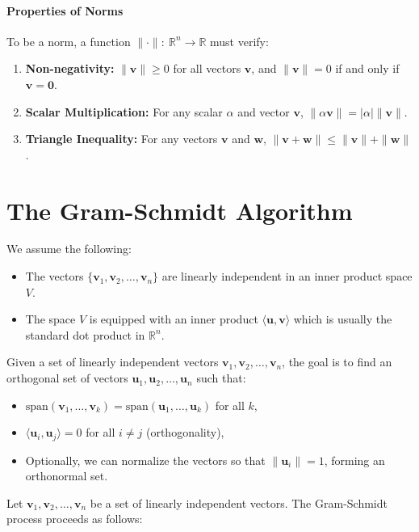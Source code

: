 \documentclass[]{article}
\newcommand{\R}{\mathbb{R}}
\begin{document}
	\paragraph{Properties of Norms}
	To be a norm, a function $\| \cdot \|: \ \R^n \to \R$ must verify:
	\begin{enumerate}
		\item \textbf{Non-negativity:}
		$\|\mathbf{v}\| \geq 0$ for all vectors $\mathbf{v}$, and $\|\mathbf{v}\| = 0$ if and only if $\mathbf{v} = \mathbf{0}$.
		\item \textbf{Scalar Multiplication:}
		For any scalar $\alpha$ and vector $\mathbf{v}$, $\|\alpha \mathbf{v}\| = |\alpha| \|\mathbf{v}\|$.
		\item \textbf{Triangle Inequality:}
		For any vectors $\mathbf{v}$ and $\mathbf{w}$, $\|\mathbf{v} + \mathbf{w}\| \leq \|\mathbf{v}\| + \|\mathbf{w}\|$.
	\end{enumerate}
	
	
	
	\section{The Gram-Schmidt Algorithm}	
	We assume the following:
	\begin{itemize}
		\item The vectors $\{ \mathbf{v}_1, \mathbf{v}_2, \dots, \mathbf{v}_n \}$ are linearly independent in an inner product space $V$.
		\item The space $V$ is equipped with an inner product $\langle \mathbf{u}, \mathbf{v} \rangle$ which is usually the standard dot product in $\mathbb{R}^n$.
	\end{itemize}
	
	Given a set of linearly independent vectors $\mathbf{v}_1, \mathbf{v}_2, \dots, \mathbf{v}_n$, the goal is to find an orthogonal set of vectors $\mathbf{u}_1, \mathbf{u}_2, \dots, \mathbf{u}_n$ such that:
	\begin{itemize}
		\item $\text{span}(\mathbf{v}_1, \dots, \mathbf{v}_k) = \text{span}(\mathbf{u}_1, \dots, \mathbf{u}_k)$ for all $k$,
		\item $\langle \mathbf{u}_i, \mathbf{u}_j \rangle = 0$ for all $i \neq j$ (orthogonality),
		\item Optionally, we can normalize the vectors so that $\|\mathbf{u}_i\| = 1$, forming an orthonormal set.
	\end{itemize}
	Let $\mathbf{v}_1, \mathbf{v}_2, \dots, \mathbf{v}_n$ be a set of linearly independent vectors.
	The Gram-Schmidt process proceeds as follows:
	
\end{document}
